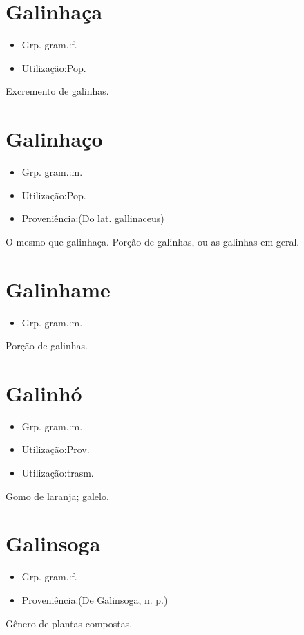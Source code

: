 \section{Galinhaça}
\begin{itemize}
\item {Grp. gram.:f.}
\end{itemize}
\begin{itemize}
\item {Utilização:Pop.}
\end{itemize}
Excremento de galinhas.
\section{Galinhaço}
\begin{itemize}
\item {Grp. gram.:m.}
\end{itemize}
\begin{itemize}
\item {Utilização:Pop.}
\end{itemize}
\begin{itemize}
\item {Proveniência:(Do lat. \textunderscore gallinaceus\textunderscore )}
\end{itemize}
O mesmo que \textunderscore galinhaça\textunderscore .
Porção de galinhas, ou as galinhas em geral.
\section{Galinhame}
\begin{itemize}
\item {Grp. gram.:m.}
\end{itemize}
Porção de galinhas.
\section{Galinhó}
\begin{itemize}
\item {Grp. gram.:m.}
\end{itemize}
\begin{itemize}
\item {Utilização:Prov.}
\end{itemize}
\begin{itemize}
\item {Utilização:trasm.}
\end{itemize}
Gomo de laranja; galelo.
\section{Galinsoga}
\begin{itemize}
\item {Grp. gram.:f.}
\end{itemize}
\begin{itemize}
\item {Proveniência:(De \textunderscore Galinsoga\textunderscore , n. p.)}
\end{itemize}
Gênero de plantas compostas.
